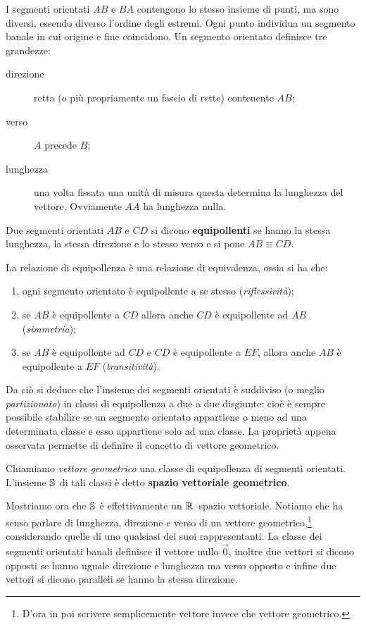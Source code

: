 I segmenti orientati $AB$ e $BA$ contengono lo stesso insieme di punti, ma sono 
diversi, essendo diverso l'ordine degli estremi. Ogni punto individua un 
segmento banale in cui origine e fine coincidono. 
Un segmento orientato definisce tre grandezze:

\begin{description}
 \item [direzione]
 retta (o più propriamente un fascio di rette) contenente $AB$;
 \item [verso]
 $A$ precede $B$;
 \item [lunghezza]
 una volta fissata una unità di misura questa determina la lunghezza del 
vettore. Ovviamente $AA$ ha lunghezza nulla.
\end{description}

\begin{definizione}
  Due segmenti orientati $AB$ e $CD$ si dicono \textbf{equipollenti} se hanno 
la stessa
  lunghezza, la stessa direzione e lo stesso verso e si pone $AB\equiv CD$. 
\end{definizione}

La relazione di equipollenza è una relazione di equivalenza, ossia si ha che:
\begin{enumerate}
 \item ogni segmento orientato è equipollente a se stesso 
(\textit{riflessività});
 \item se $AB$ è equipollente a $CD$ allora anche $CD$ è
equipollente ad $AB$ (\textit{simmetria}); 
 \item se $AB$ è equipollente ad $CD$ e $CD$ è equipollente a $EF$,
allora anche $AB$ è equipollente a $EF$ (\textit{transitività}).
\end{enumerate}

Da ciò si deduce che l'insieme dei segmenti orientati è suddiviso (o meglio 
\textit{partizionato}) in classi di equipollenza a due a due disgiunte: cioè è 
sempre possibile stabilire se un segmento orientato appartiene o meno
ad una determinata classe e esso appartiene solo ad una classe. La proprietà 
appena osservata permette di definire il concetto di vettore geometrico.

\begin{definizione}
  Chiamiamo \textit{vettore geometrico} una classe di equipollenza di segmenti 
orientati. 
  L'insieme $\mathbb{S}^{}$ di tali classi è detto \textbf{spazio vettoriale 
geometrico}.
\end{definizione}

Mostriamo ora che $\mathbb{S}^{}$ è effettivamente un  $\mathbb{R}^{}$--spazio vettoriale. 
Notiamo che ha senso parlare 
di lunghezza, direzione e verso di un vettore geometrico,\footnote{D'ora in poi 
scrivere semplicemente vettore invece che vettore geometrico.} considerando 
quelle di uno 
qualsiasi dei suoi rappresentanti. La classe dei segmenti orientati banali 
definisce il vettore
nullo $\vec 0$, inoltre due vettori si dicono opposti se hanno uguale direzione 
e lunghezza 
ma verso opposto e infine due vettori si dicono paralleli se hanno la stessa 
direzione.

